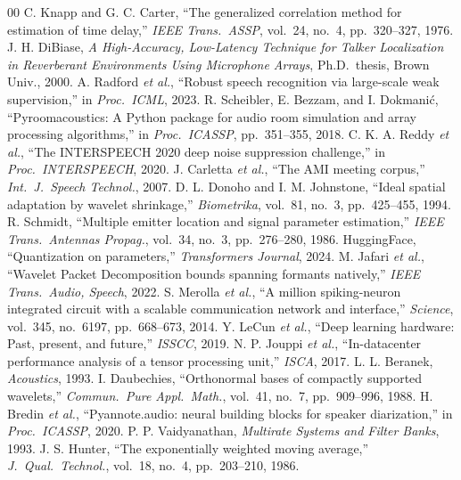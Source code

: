 \documentclass[conference, 10pt]{IEEEtran}
\begin{document}
\begin{thebibliography}{00}
C. Knapp and G. C. Carter, ``The generalized correlation method for estimation of time delay,'' \textit{IEEE Trans.\ ASSP}, vol.~24, no.~4, pp.~320--327, 1976.
J. H. DiBiase, \textit{A High-Accuracy, Low-Latency Technique for Talker Localization in Reverberant Environments Using Microphone Arrays}, Ph.D.\ thesis, Brown Univ., 2000.
A. Radford \textit{et al.}, ``Robust speech recognition via large-scale weak supervision,'' in \textit{Proc.\ ICML}, 2023.
R. Scheibler, E. Bezzam, and I. Dokmani\'{c}, ``Pyroomacoustics: A Python package for audio room simulation and array processing algorithms,'' in \textit{Proc.\ ICASSP}, pp.~351--355, 2018.
C. K. A. Reddy \textit{et al.}, ``The INTERSPEECH 2020 deep noise suppression challenge,'' in \textit{Proc.\ INTERSPEECH}, 2020.
J. Carletta \textit{et al.}, ``The AMI meeting corpus,'' \textit{Int.\ J.\ Speech Technol.}, 2007.
D. L. Donoho and I. M. Johnstone, ``Ideal spatial adaptation by wavelet shrinkage,'' \textit{Biometrika}, vol.~81, no.~3, pp.~425--455, 1994.
R. Schmidt, ``Multiple emitter location and signal parameter estimation,'' \textit{IEEE Trans.\ Antennas Propag.}, vol.~34, no.~3, pp.~276--280, 1986.
HuggingFace, ``Quantization on parameters,'' \textit{Transformers Journal}, 2024.
M. Jafari \textit{et al.}, ``Wavelet Packet Decomposition bounds spanning formants natively,'' \textit{IEEE Trans.\ Audio, Speech}, 2022.
S. Merolla \textit{et al.}, ``A million spiking-neuron integrated circuit with a scalable communication network and interface,'' \textit{Science}, vol.~345, no.~6197, pp.~668--673, 2014.
Y. LeCun \textit{et al.}, ``Deep learning hardware: Past, present, and future,'' \textit{ISSCC}, 2019.
N. P. Jouppi \textit{et al.}, ``In-datacenter performance analysis of a tensor processing unit,'' \textit{ISCA}, 2017.
L. L. Beranek, \textit{Acoustics}, 1993.
I. Daubechies, ``Orthonormal bases of compactly supported wavelets,'' \textit{Commun.\ Pure Appl.\ Math.}, vol.~41, no.~7, pp.~909--996, 1988.
H. Bredin \textit{et al.}, ``Pyannote.audio: neural building blocks for speaker diarization,'' in \textit{Proc.\ ICASSP}, 2020.
P. P. Vaidyanathan, \textit{Multirate Systems and Filter Banks}, 1993.
J. S. Hunter, ``The exponentially weighted moving average,'' \textit{J.\ Qual.\ Technol.}, vol.~18, no.~4, pp.~203--210, 1986.
\end{thebibliography}
\end{document}
